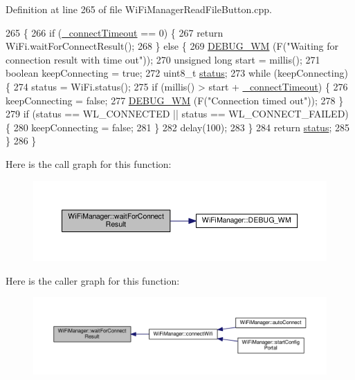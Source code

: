 Definition at line 265 of file Wi\+Fi\+Manager\+Read\+File\+Button.\+cpp.


\begin{DoxyCode}
265                                           \{
266   \textcolor{keywordflow}{if} (\hyperlink{class_wi_fi_manager_a6c03ca5d418b4d46e9a6d751a902184c}{\_connectTimeout} == 0) \{
267     \textcolor{keywordflow}{return} WiFi.waitForConnectResult();
268   \} \textcolor{keywordflow}{else} \{
269     \hyperlink{class_wi_fi_manager_ae5f595c670ccbcf9a191baf50f5c7c26}{DEBUG\_WM} (F(\textcolor{stringliteral}{"Waiting for connection result with time out"}));
270     \textcolor{keywordtype}{unsigned} \textcolor{keywordtype}{long} start = millis();
271     \textcolor{keywordtype}{boolean} keepConnecting = \textcolor{keyword}{true};
272     uint8\_t \hyperlink{class_wi_fi_manager_acceea0054a30c18809b34151d4e9eb0b}{status};
273     \textcolor{keywordflow}{while} (keepConnecting) \{
274       status = WiFi.status();
275       \textcolor{keywordflow}{if} (millis() > start + \hyperlink{class_wi_fi_manager_a6c03ca5d418b4d46e9a6d751a902184c}{\_connectTimeout}) \{
276         keepConnecting = \textcolor{keyword}{false};
277         \hyperlink{class_wi_fi_manager_ae5f595c670ccbcf9a191baf50f5c7c26}{DEBUG\_WM} (F(\textcolor{stringliteral}{"Connection timed out"}));
278       \}
279       \textcolor{keywordflow}{if} (status == WL\_CONNECTED || status == WL\_CONNECT\_FAILED) \{
280         keepConnecting = \textcolor{keyword}{false};
281       \}
282       delay(100);
283     \}
284     \textcolor{keywordflow}{return} \hyperlink{class_wi_fi_manager_acceea0054a30c18809b34151d4e9eb0b}{status};
285   \}
286 \}
\end{DoxyCode}
Here is the call graph for this function\+:\nopagebreak
\begin{figure}[H]
\begin{center}
\leavevmode
\includegraphics[width=350pt]{d4/dc8/class_wi_fi_manager_a89a3f33997aa662ad223d6c150c1eede_cgraph}
\end{center}
\end{figure}
Here is the caller graph for this function\+:\nopagebreak
\begin{figure}[H]
\begin{center}
\leavevmode
\includegraphics[width=350pt]{d4/dc8/class_wi_fi_manager_a89a3f33997aa662ad223d6c150c1eede_icgraph}
\end{center}
\end{figure}


